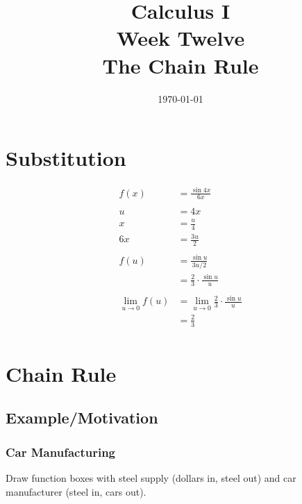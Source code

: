 \documentclass[letterpaper, landscape]{exam}
\author{}
\date{\today}
\title{Calculus I \\ Week Twelve \\ The Chain Rule}
\begin{document}
  \maketitle
  \tableofcontents

  \newpage 

  \section{Substitution} %
  
  \begin{align*}
    f(x)                & = \frac{\sin 4x}{6x} \\
    \\
    u                   & = 4x \\
    x                   & = \frac{u}{4} \\
    6x                  & = \frac{3u}{2} \\
    \\
    f(u)                & = \frac{\sin u}{3u/2} \\
                        & = \frac{2}{3} \cdot \frac{\sin u}{u} \\
    \\
    \lim_{u \to 0} f(u) & = \lim_{u \to 0} \frac{2}{3} \cdot \frac{\sin u}{u} \\
                        & = \frac{2}{3} \\
  \end{align*}

  \newpage

  \section{Chain Rule} %
  
  \subsection{Example/Motivation} %

  \subsubsection{Car Manufacturing} %
  
  Draw function boxes with steel supply (dollars in, steel out) and car
  manufacturer (steel in, cars out).
\end{document}
